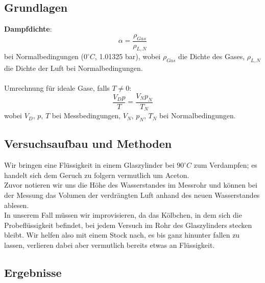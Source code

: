 \documentclass{article}
\begin{document}
\subsection{Grundlagen}
\textbf{Dampfdichte}: 
\begin{equation}
\label{dampfdichte_norm}
\alpha=\frac{\rho_{Gas}}{\rho_{L,N}}
\end{equation}
bei Normalbedingungen ($0^\circ C$, 1.01325 bar), wobei $\rho_{Gas}$ die Dichte des Gases, $\rho_{L,N}$ die Dichte der Luft bei Normalbedingungen.\\
\\
Umrechnung für ideale Gase, falls $T\neq 0$:
\begin{equation}
\frac{V_Dp}{T}=\frac{V_Np_N}{T_N}
\end{equation}
wobei $V_D$, $p$, $T$ bei Messbedingungen, $V_N$, $p_N$, $T_N$ bei Normalbedingungen.
\subsection{Versuchsaufbau und Methoden}
Wir bringen eine Flüssigkeit in einem Glaszylinder bei $90^\circ C$ zum Verdampfen; es handelt sich dem Geruch zu folgern vermutlich um Aceton. \\
Zuvor notieren wir uns die Höhe des Wasserstandes im Messrohr und können bei der Messung das Volumen der verdrängten Luft anhand des neuen Wasserstandes ablesen.\\
In unserem Fall müssen wir  improvisieren, da das Kölbchen, in dem sich die Probeflüssigkeit befindet, bei jedem Versuch im Rohr des Glaszylinders stecken bleibt. Wir helfen also mit einem Stock nach, es bis ganz hinunter fallen zu lassen, verlieren dabei aber vermutlich bereits etwas an Flüssigkeit. 
\subsection{Ergebnisse}
\end{document}
